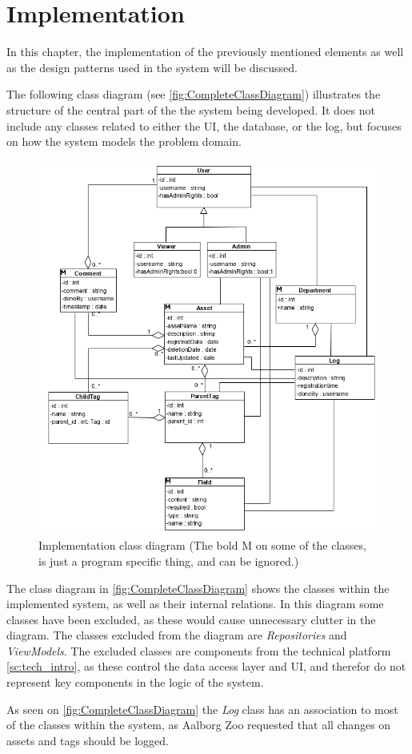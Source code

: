 \chapter{Implementation}
In this chapter, the implementation of the previously mentioned elements as well as the design patterns used in the system will be discussed.
\par
The following class diagram (see \autoref{fig:CompleteClassDiagram}) illustrates the structure of the central part of the the system being developed. It does not include any classes related to either the UI, the database, or the log, but focuses on how the system models the problem domain. 

\begin{figure}[H]
    \centering
    \includegraphics[width=1\textwidth]{figures/ClassDiagrams/ClassDiagramV6.PNG}
    \caption{Implementation class diagram (The bold M on some of the classes, is just a program specific thing, and can be ignored.)}
    \label{fig:CompleteClassDiagram}
\end{figure}

The class diagram in \autoref{fig:CompleteClassDiagram} shows the classes within the implemented system, as well as their internal relations. In this diagram some classes have been excluded, as these would cause unnecessary clutter in the diagram. The classes excluded from the diagram are \textit{Repositories} and \textit{ViewModels}. The excluded classes are components from the technical platform \autoref{sc:tech_intro}, as these control the data access layer and UI, and therefor do not represent key components in the logic of the system. 
\par
As seen on \autoref{fig:CompleteClassDiagram} the \textit{Log} class has an association to most of the classes within the system, as Aalborg Zoo requested that all changes on assets and tags should be logged. 